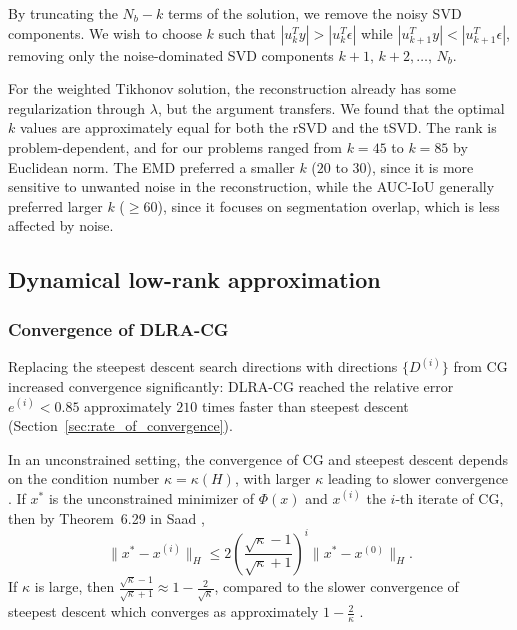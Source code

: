 By truncating the $N_b - k$ terms of the solution, we remove the noisy SVD components. We wish to choose $k$ such that $|u_k^T y| > |u_k^T \epsilon|$ while $|u_{k+1}^T y| < |u_{k+1}^T \epsilon|$, removing only the noise-dominated SVD components $k+1,\, k+2,\dots,\, N_b$.

For the weighted Tikhonov solution, the reconstruction already has some regularization through $\lambda$, but the argument transfers. We found that the optimal $k$ values are approximately equal for both the rSVD and the tSVD. The rank is problem-dependent, and for our problems ranged from $k = 45$ to $k = 85$ by Euclidean norm. The EMD preferred a smaller $k$ ($20$ to $30$), since it is more sensitive to unwanted noise in the reconstruction, while the AUC-IoU generally preferred larger $k$ ($\ge 60$), since it focuses on segmentation overlap, which is less affected by noise.


\subsection{Dynamical low-rank approximation}
\subsubsection{Convergence of DLRA-CG}\label{sec:convergence_of_DLRA_CG}
Replacing the steepest descent search directions with directions $\{D^{(i)}\}$ from CG increased convergence significantly: DLRA-CG reached the relative error $e^{(i)} < 0.85$ approximately $210$ times faster than steepest descent (Section~\ref{sec:rate_of_convergence}).

In an unconstrained setting, the convergence of CG and steepest descent depends on the condition number $\kappa = \kappa(H)$, with larger $\kappa$ leading to slower convergence \cite{saadIterativeMethodsSparse2003}. If $x^*$ is the unconstrained minimizer of $\Phi(x)$ and $x^{(i)}$ the $i$-th iterate of CG, then by Theorem~6.29 in Saad \cite{saadIterativeMethodsSparse2003},
\begin{equation}\label{eq:convergence_of_CG}
    \| x^* - x^{(i)} \|_H \le 2 \left(
        \frac{\sqrt{\kappa} - 1}{\sqrt{\kappa} + 1}
    \right)^i
    \| x^* - x^{(0)} \|_H.
\end{equation}
If $\kappa$ is large, then $\tfrac{\sqrt{\kappa} - 1}{\sqrt{\kappa} + 1} \approx 1 - \tfrac{2}{\sqrt{\kappa}}$, compared to the slower convergence of steepest descent which converges as approximately $1 - \tfrac{2}{\kappa}$ \cite{saadIterativeMethodsSparse2003}.

